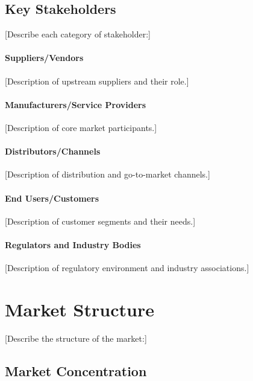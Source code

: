 \documentclass[11pt,letterpaper]{report}
\begin{document}
\subsection{Key Stakeholders}

[Describe each category of stakeholder:]

\paragraph{Suppliers/Vendors}
[Description of upstream suppliers and their role.]

\paragraph{Manufacturers/Service Providers}
[Description of core market participants.]

\paragraph{Distributors/Channels}
[Description of distribution and go-to-market channels.]

\paragraph{End Users/Customers}
[Description of customer segments and their needs.]

\paragraph{Regulators and Industry Bodies}
[Description of regulatory environment and industry associations.]

\section{Market Structure}


[Describe the structure of the market:]

\subsection{Market Concentration}
\end{document}
